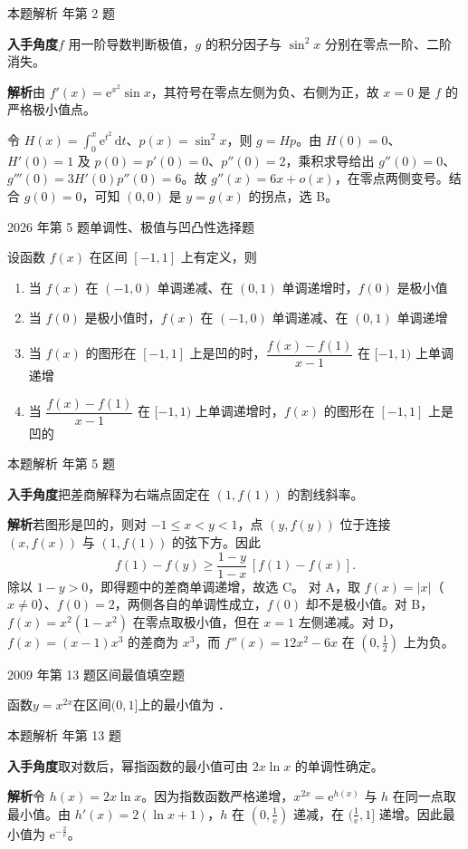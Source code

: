 \documentclass[UTF8,zihao=-4,fontset=fandol]{ctexart}
\newcommand{\blank}{\underline{\hspace{5em}}}
\newenvironment{abcd}{\begin{enumerate}[label=\textup{(\Alph*)},leftmargin=2.3em,itemsep=1pt,topsep=4pt,parsep=1pt]}{\end{enumerate}}
\newcommand{\choices}[4]{%
  \begin{abcd}
    \item #1
    \item #2
    \item #3
    \item #4
  \end{abcd}}
\newcommand{\QuestionPage}[6]{%
  \par\noindent\begin{minipage}{\linewidth}
  \raggedright
  {\small\textcolor{black!60}{#3\quad #5}\hfill\textcolor{accent}{#2}}\par\smallskip}
\newcommand{\QuestionEnd}{\end{minipage}\par\medskip}
\newcommand{\QuestionPage}[6]{%
  \clearpage
  {\small\textcolor{accent}{#1\hfill #2}}\par\medskip
  {\small\textcolor{black!60}{#3\quad #5\hfill #6}}\par\vspace{9bp}}
\newcommand{\QuestionEnd}{}
\newenvironment{QuestionSolution}[1]{%
  \clearpage
  {\small\textcolor{black!60}{本题解析\quad #1}}\par\medskip
}{\par\clearpage}
\begin{document}
\begin{QuestionSolution}{2025 年第 2 题}
\textbf{入手角度}\quad \(f\) 用一阶导数判断极值，\(g\) 的积分因子与 \(\sin^2x\) 分别在零点一阶、二阶消失。

\textbf{解析}\quad 由 \(f'(x)=\mathrm{e}^{x^2}\sin x\)，其符号在零点左侧为负、右侧为正，故 \(x=0\) 是 \(f\) 的严格极小值点。

令 \(H(x)=\int_0^x \mathrm{e}^{t^2}\,\mathrm{d}t\)、\(p(x)=\sin^2x\)，则 \(g=Hp\)。由 \(H(0)=0\)、\(H'(0)=1\) 及 \(p(0)=p'(0)=0\)、\(p''(0)=2\)，乘积求导给出 \(g''(0)=0\)、\(g'''(0)=3H'(0)p''(0)=6\)。故 \(g''(x)=6x+o(x)\)，在零点两侧变号。结合 \(g(0)=0\)，可知 \((0,0)\) 是 \(y=g(x)\) 的拐点，选 B。
\end{QuestionSolution}

\QuestionPage{2.6 函数性态的研究}{选择题}{2026 年第 5 题}{1}{单调性、极值与凹凸性}{116 / 234}
设函数 \(f(x)\) 在区间 \([-1,1]\) 上有定义，则
\choices{当 \(f(x)\) 在 \((-1,0)\) 单调递减、在 \((0,1)\) 单调递增时，\(f(0)\) 是极小值}{当 \(f(0)\) 是极小值时，\(f(x)\) 在 \((-1,0)\) 单调递减、在 \((0,1)\) 单调递增}{当 \(f(x)\) 的图形在 \([-1,1]\) 上是凹的时，\(\dfrac{f(x)-f(1)}{x-1}\) 在 \([-1,1)\) 上单调递增}{当 \(\dfrac{f(x)-f(1)}{x-1}\) 在 \([-1,1)\) 上单调递增时，\(f(x)\) 的图形在 \([-1,1]\) 上是凹的}
\QuestionEnd

\begin{QuestionSolution}{2026 年第 5 题}
\textbf{入手角度}\quad 把差商解释为右端点固定在 \((1,f(1))\) 的割线斜率。

\textbf{解析}\quad 若图形是凹的，则对 \(-1\le x<y<1\)，点 \((y,f(y))\) 位于连接 \((x,f(x))\) 与 \((1,f(1))\) 的弦下方。因此
\[
f(1)-f(y)\ge \frac{1-y}{1-x}\,[f(1)-f(x)].
\]
除以 \(1-y>0\)，即得题中的差商单调递增，故选 C。
对 A，取 \(f(x)=|x|\)（\(x\ne0\)）、\(f(0)=2\)，两侧各自的单调性成立，\(f(0)\) 却不是极小值。对 B，\(f(x)=x^2(1-x^2)\) 在零点取极小值，但在 \(x=1\) 左侧递减。对 D，\(f(x)=(x-1)x^3\) 的差商为 \(x^3\)，而 \(f''(x)=12x^2-6x\) 在 \((0,\frac{1}{2})\) 上为负。
\end{QuestionSolution}

\QuestionPage{2.6 函数性态的研究}{填空题}{2009 年第 13 题}{2}{区间最值}{117 / 234}
函数$y = x^{2x}$在区间$(0,1]$上的最小值为 \blank{}．
\QuestionEnd

\begin{QuestionSolution}{2009 年第 13 题}
\textbf{入手角度}\quad 取对数后，幂指函数的最小值可由 \(2x\ln x\) 的单调性确定。

\textbf{解析}\quad 令 \(h(x)=2x\ln x\)。因为指数函数严格递增，\(x^{2x}=\mathrm{e}^{h(x)}\) 与 \(h\) 在同一点取最小值。由 \(h'(x)=2(\ln x+1)\)，\(h\) 在 \((0,\frac{1}{\mathrm{e}})\) 递减，在 \((\frac{1}{\mathrm{e}},1]\) 递增。因此最小值为 \(\boxed{\mathrm{e}^{-\frac{2}{\mathrm{e}}}}\)。
\end{QuestionSolution}
\end{document}
